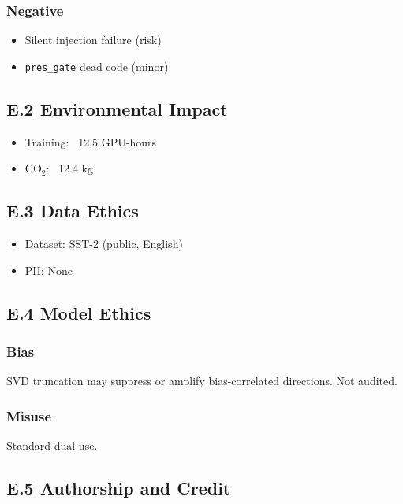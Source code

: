 \subsubsection{Negative}
\begin{itemize}
\item Silent injection failure (risk)
\item \texttt{pres\_gate} dead code (minor)

\end{itemize}
\subsection{E.2 Environmental Impact}

\begin{itemize}
\item Training: ~12.5 GPU-hours
\item CO$_2$: ~12.4 kg

\end{itemize}
\subsection{E.3 Data Ethics}

\begin{itemize}
\item Dataset: SST-2 (public, English)
\item PII: None

\end{itemize}
\subsection{E.4 Model Ethics}

\subsubsection{Bias}

SVD truncation may suppress or amplify bias-correlated directions. 
Not audited.

\subsubsection{Misuse}

Standard dual-use.

\subsection{E.5 Authorship and Credit}

